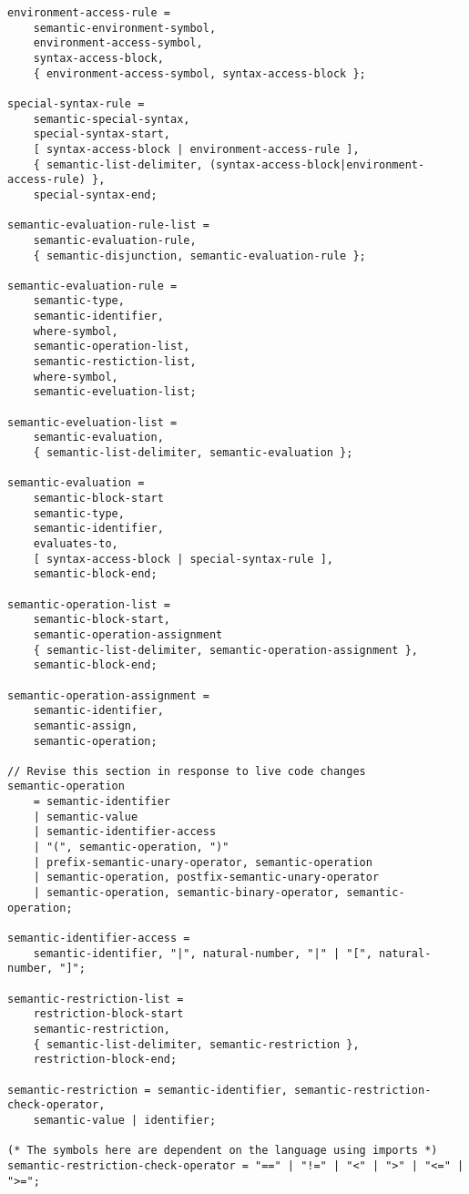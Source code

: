 \begin{lstlisting}
environment-access-rule = 
    semantic-environment-symbol,
    environment-access-symbol,
    syntax-access-block,
    { environment-access-symbol, syntax-access-block };

special-syntax-rule = 
    semantic-special-syntax,
    special-syntax-start,
    [ syntax-access-block | environment-access-rule ],
    { semantic-list-delimiter, (syntax-access-block|environment-access-rule) },
    special-syntax-end;

semantic-evaluation-rule-list = 
    semantic-evaluation-rule,
    { semantic-disjunction, semantic-evaluation-rule };

semantic-evaluation-rule = 
    semantic-type,
    semantic-identifier,
    where-symbol,
    semantic-operation-list,
    semantic-restiction-list,
    where-symbol, 
    semantic-eveluation-list;

semantic-eveluation-list = 
    semantic-evaluation,
    { semantic-list-delimiter, semantic-evaluation };

semantic-evaluation = 
    semantic-block-start
    semantic-type, 
    semantic-identifier,
    evaluates-to,
    [ syntax-access-block | special-syntax-rule ],
    semantic-block-end;

semantic-operation-list = 
    semantic-block-start,
    semantic-operation-assignment
    { semantic-list-delimiter, semantic-operation-assignment },
    semantic-block-end;

semantic-operation-assignment =
    semantic-identifier,
    semantic-assign,
    semantic-operation;

// Revise this section in response to live code changes
semantic-operation 
    = semantic-identifier
    | semantic-value
    | semantic-identifier-access
    | "(", semantic-operation, ")"
    | prefix-semantic-unary-operator, semantic-operation
    | semantic-operation, postfix-semantic-unary-operator
    | semantic-operation, semantic-binary-operator, semantic-operation;

semantic-identifier-access = 
    semantic-identifier, "|", natural-number, "|" | "[", natural-number, "]";

semantic-restriction-list = 
    restriction-block-start
    semantic-restriction,
    { semantic-list-delimiter, semantic-restriction },
    restriction-block-end;

semantic-restriction = semantic-identifier, semantic-restriction-check-operator,
    semantic-value | identifier;

(* The symbols here are dependent on the language using imports *)
semantic-restriction-check-operator = "==" | "!=" | "<" | ">" | "<=" | ">=";


\end{lstlisting}
